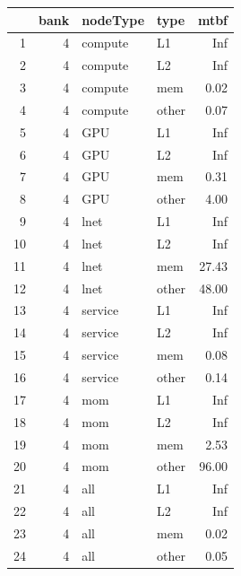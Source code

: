 \begin{table}[t]
\centering
\begin{tabular}{rrllr}
  \hline
 & bank & nodeType & type & mtbf \\ 
  \hline
1 &   4 & compute & L1 & Inf \\ 
  2 &   4 & compute & L2 & Inf \\ 
  3 &   4 & compute & mem & 0.02 \\ 
  4 &   4 & compute & other & 0.07 \\ 
  5 &   4 & GPU & L1 & Inf \\ 
  6 &   4 & GPU & L2 & Inf \\ 
  7 &   4 & GPU & mem & 0.31 \\ 
  8 &   4 & GPU & other & 4.00 \\ 
  9 &   4 & lnet & L1 & Inf \\ 
  10 &   4 & lnet & L2 & Inf \\ 
  11 &   4 & lnet & mem & 27.43 \\ 
  12 &   4 & lnet & other & 48.00 \\ 
  13 &   4 & service & L1 & Inf \\ 
  14 &   4 & service & L2 & Inf \\ 
  15 &   4 & service & mem & 0.08 \\ 
  16 &   4 & service & other & 0.14 \\ 
  17 &   4 & mom & L1 & Inf \\ 
  18 &   4 & mom & L2 & Inf \\ 
  19 &   4 & mom & mem & 2.53 \\ 
  20 &   4 & mom & other & 96.00 \\ 
  21 &   4 & all & L1 & Inf \\ 
  22 &   4 & all & L2 & Inf \\ 
  23 &   4 & all & mem & 0.02 \\ 
  24 &   4 & all & other & 0.05 \\

   \hline
\end{tabular}
\end{table}

